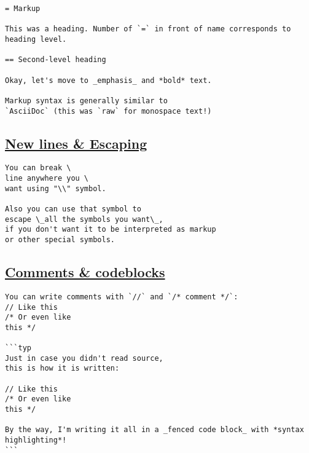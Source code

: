 \begin{verbatim}
= Markup

This was a heading. Number of `=` in front of name corresponds to heading level.

== Second-level heading

Okay, let's move to _emphasis_ and *bold* text.

Markup syntax is generally similar to
`AsciiDoc` (this was `raw` for monospace text!)
\end{verbatim}

\pandocbounded{}

\subsection{\texorpdfstring{\hyperref[new-lines--escaping]{New lines \&
Escaping}}{New lines \& Escaping}}\label{new-lines--escaping}

\begin{verbatim}
You can break \
line anywhere you \
want using "\\" symbol.

Also you can use that symbol to
escape \_all the symbols you want\_,
if you don't want it to be interpreted as markup
or other special symbols.
\end{verbatim}

\pandocbounded{}

\subsection{\texorpdfstring{\hyperref[comments--codeblocks]{Comments \&
codeblocks}}{Comments \& codeblocks}}\label{comments--codeblocks}

\begin{verbatim}
You can write comments with `//` and `/* comment */`:
// Like this
/* Or even like
this */

```typ
Just in case you didn't read source,
this is how it is written:

// Like this
/* Or even like
this */

By the way, I'm writing it all in a _fenced code block_ with *syntax highlighting*!
```
\end{verbatim}

\pandocbounded{}


